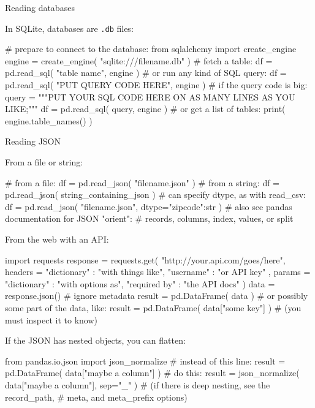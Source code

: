 \documentclass[a4paper,landscape,columns=3]{cheatsheet}
\def\sect#1{\begin{tcolorbox}[colback=blue!5!white,colframe=blue!75!black,size=title,leftrule=2mm]
    \large #1
\end{tcolorbox}}
\begin{document}
\sect{Reading databases}

In SQLite, databases are \verb'.db' files:
\begin{python}
# prepare to connect to the database:
from sqlalchemy import create_engine
engine = create_engine( "sqlite:///filename.db" )
# fetch a table:
df = pd.read_sql( "table name", engine )
# or run any kind of SQL query:
df = pd.read_sql( "PUT QUERY CODE HERE", engine )
# if the query code is big:
query = """PUT YOUR SQL CODE
           HERE ON AS MANY LINES
           AS YOU LIKE;"""
df = pd.read_sql( query, engine )
# or get a list of tables:
print( engine.table_names() )
\end{python}

\sect{Reading JSON}

From a file or string:
\begin{python}
# from a file:
df = pd.read_json( "filename.json" )
# from a string:
df = pd.read_json( string_containing_json )
# can specify dtype, as with read_csv:
df = pd.read_json( "filename.json",
                   dtype={"zipcode":str} )
# also see pandas documentation for JSON "orient":
# records, columns, index, values, or split
\end{python}

From the web with an API:
\begin{python}
import requests
response = requests.get(
    "http://your.api.com/goes/here",
    headers = {
        "dictionary" : "with things like",
        "username" : "or API key"
    },
    params = {
        "dictionary" : "with options as",
        "required by" : "the API docs"
    } )
data = response.json()  # ignore metadata
result = pd.DataFrame( data )
# or possibly some part of the data, like:
result = pd.DataFrame( data["some key"] )
# (you must inspect it to know)
\end{python}

If the JSON has nested objects, you can flatten:
\begin{python}
from pandas.io.json import json_normalize
# instead of this line:
result = pd.DataFrame( data["maybe a column"] )
# do this:
result = json_normalize( data["maybe a column"],
                         sep="_" )
# (if there is deep nesting, see the record_path,
# meta, and meta_prefix options)
\end{python}
\end{document}
